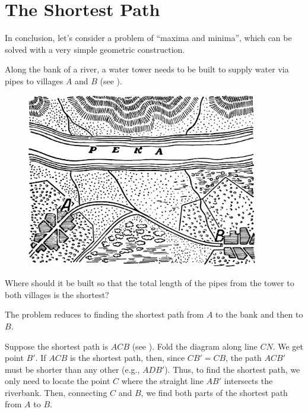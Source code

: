 
\section{The Shortest Path}
\label{sec-12.15}

In conclusion, let’s consider a problem of ``maxima and minima'', which can be solved with a very simple geometric construction.


\ques Along the bank of a river, a water tower needs to be built to supply water via pipes to villages $A$ and $B$ (see ).


\begin{figure}[h!]
\centering
\includegraphics[width=0.9\textwidth]{figures/ch-12/fig-191.pdf}
\end{figure}


Where should it be built so that the total length of the pipes from the tower to both villages is the shortest?

\ans The problem reduces to finding the shortest path from $A$ to the bank and then to $B$.

Suppose the shortest path is $ACB$ (see ). Fold the diagram along line $CN$. We get point $B'$. If $ACB$ is the shortest path, then, since $CB' = CB$, the path $ACB'$ must be shorter than any other (e.g., $ADB'$). Thus, to find the shortest path, we only need to locate the point $C$ where the straight line $AB'$ intersects the riverbank. Then, connecting $C$ and $B$, we find both parts of the shortest path from $A$ to $B$.

